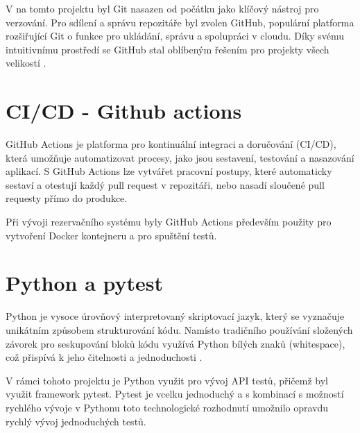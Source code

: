 V na tomto projektu byl Git nasazen od počátku jako klíčový nástroj pro verzování. Pro sdílení a správu repozitáře byl zvolen GitHub, populární platforma rozšiřující Git o funkce pro ukládání, správu a spolupráci v cloudu. Díky svému intuitivnímu prostředí se GitHub stal oblíbeným řešením pro projekty všech velikostí \cite{githubAboutGitHub}.

\section{CI/CD - Github actions}
GitHub Actions je platforma pro kontinuální integraci a doručování (CI/CD), která umožňuje automatizovat procesy, jako jsou sestavení, testování a nasazování aplikací. S GitHub Actions lze vytvářet pracovní postupy, které automaticky sestaví a otestují každý pull request v repozitáři, nebo nasadí sloučené pull requesty přímo do produkce\cite{githubinc_2024_understanding}.

Při vývoji rezervačního systému byly GitHub Actions především použity pro vytvoření Docker kontejneru a pro spuštění testů.

\section{Python a pytest}
Python je vysoce úrovňový interpretovaný skriptovací jazyk, který se vyznačuje unikátním způsobem strukturování kódu. Namísto tradičního používání složených závorek pro seskupování bloků kódu využívá Python bílých znaků (whitespace), což přispívá k jeho čitelnosti a jednoduchosti \cite{kuhlman2009python, van1990functional}.

V rámci tohoto projektu je Python využit pro vývoj API testů, přičemž byl využit framework pytest. Pytest je vcelku jednoduchý a s kombinací s možností rychlého vývoje v Pythonu toto technologické rozhodnutí umožnilo opravdu rychlý vývoj jednoduchých testů.
